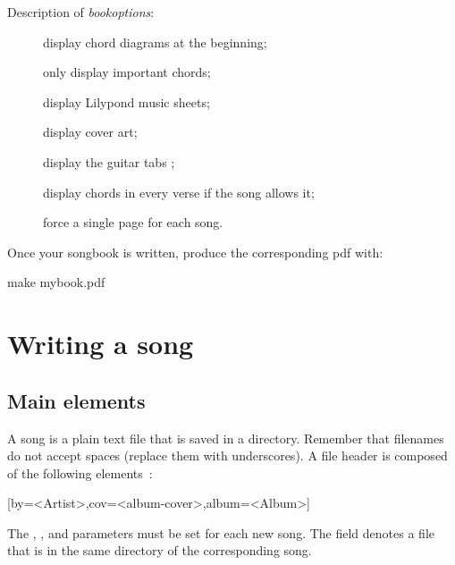 Description of \emph{bookoptions}:
\begin{description}
  \item[] display chord diagrams at the beginning;
  \item[] only display important chords;
  \item[] display Lilypond music sheets;
  \item[] display cover art;
  \item[] display the guitar tabs ;
  \item[] display chords in every verse if the song allows it;
  \item[] force a single page for each song.
\end{description}


Once your songbook  is written, produce the corresponding pdf with:
\begin{unix}
make mybook.pdf
\end{unix}


\section{Writing a song}
\label{sec:write-song}

\subsection{Main elements}

A song is a plain text file  that is saved in a
 directory. Remember that filenames do not
accept spaces (replace them with underscores). A  file header
is composed of the following elements~:

\begin{song}
  [by=<Artist>,cov=<album-cover>,album=<Album>]
\end{song}

The , ,  and
 parameters must be set for each new song. The field
 denotes a file  that is in
the same directory of the corresponding  song. 

